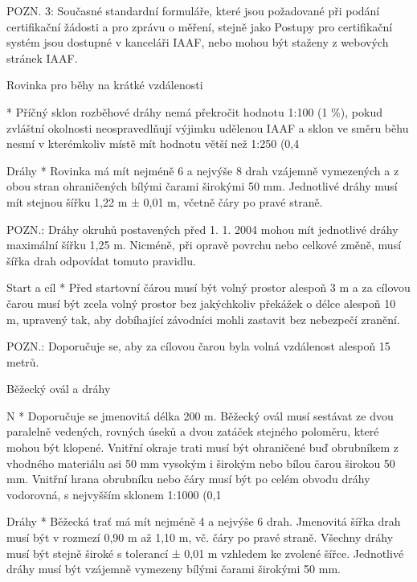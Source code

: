 POZN. 3: Současné standardní formuláře, které jsou požadované při podání certifikační žádosti a pro zprávu o měření, stejně jako Postupy pro certifikační systém jsou dostupné v kanceláři IAAF, nebo mohou být staženy z webových stránek IAAF.
\enditems

\secc Rovinka pro běhy na krátké vzdálenosti

* Příčný sklon rozběhové dráhy nemá překročit hodnotu 1:100 (1 \%), pokud zvláštní okolnosti neospravedlňují výjimku udělenou IAAF a sklon ve směru běhu nesmí v kterémkoliv místě mít hodnotu větší než 1:250 (0,4 %

Dráhy
* Rovinka má mít nejméně 6 a nejvýše 8 drah vzájemně vymezených a z obou stran ohraničených bílými čarami širokými 50 mm. Jednotlivé dráhy musí mít stejnou šířku 1,22 m ± 0,01 m, včetně čáry po pravé straně.

POZN.: Dráhy okruhů postavených před 1. 1. 2004 mohou mít jednotlivé dráhy maximální šířku 1,25 m.  Nicméně, při opravě povrchu nebo celkové změně, musí šířka drah odpovídat tomuto pravidlu.

Start a cíl
* Před startovní čárou musí být volný prostor alespoň 3 m a za cílovou čarou musí být zcela volný prostor bez jakýchkoliv překážek o délce alespoň 10 m, upravený tak, aby dobíhající závodníci mohli zastavit bez nebezpečí zranění.

POZN.: Doporučuje se, aby za cílovou čarou byla volná vzdálenost alespoň 15 metrů.
\enditems

\secc Běžecký ovál a dráhy

\begitems \style N
* Doporučuje se jmenovitá délka 200 m. Běžecký ovál musí sestávat ze dvou paralelně vedených, rovných úseků a dvou zatáček stejného poloměru, které mohou být klopené. Vnitřní okraje trati musí být ohraničené buď obrubníkem z vhodného materiálu asi 50 mm vysokým i širokým nebo bílou čarou širokou 50 mm. Vnitřní hrana obrubníku nebo čáry musí být po celém obvodu dráhy vodorovná, s nejvyšším sklonem 1:1000 (0,1 %

Dráhy
* Běžecká trať má mít nejméně 4 a nejvýše 6 drah. Jmenovitá šířka drah musí být v rozmezí 0,90 m až 1,10 m, vč. čáry po pravé straně. Všechny dráhy musí být stejně široké s tolerancí ± 0,01 m vzhledem ke zvolené šířce. Jednotlivé dráhy musí být vzájemně vymezeny bílými čarami širokými 50 mm.

